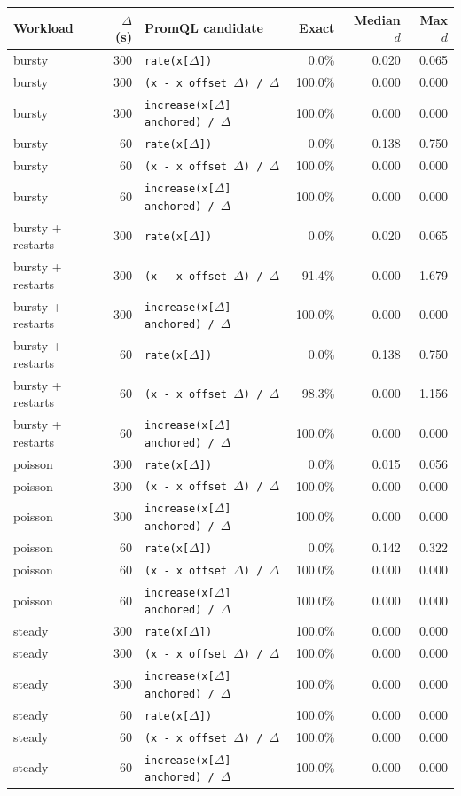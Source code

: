 \begin{tabular}{@{}lrlrrr@{}}
\toprule
Workload & $\Delta$ (s) & PromQL candidate & Exact & Median $d$ & Max $d$ \\
\midrule
bursty & 300 & \texttt{rate(x[$\Delta$])} & 0.0\% & 0.020 & 0.065 \\
bursty & 300 & \texttt{(x - x offset $\Delta$) / $\Delta$} & 100.0\% & 0.000 & 0.000 \\
bursty & 300 & \texttt{increase(x[$\Delta$] anchored) / $\Delta$} & 100.0\% & 0.000 & 0.000 \\
bursty & 60 & \texttt{rate(x[$\Delta$])} & 0.0\% & 0.138 & 0.750 \\
bursty & 60 & \texttt{(x - x offset $\Delta$) / $\Delta$} & 100.0\% & 0.000 & 0.000 \\
bursty & 60 & \texttt{increase(x[$\Delta$] anchored) / $\Delta$} & 100.0\% & 0.000 & 0.000 \\
bursty + restarts & 300 & \texttt{rate(x[$\Delta$])} & 0.0\% & 0.020 & 0.065 \\
bursty + restarts & 300 & \texttt{(x - x offset $\Delta$) / $\Delta$} & 91.4\% & 0.000 & 1.679 \\
bursty + restarts & 300 & \texttt{increase(x[$\Delta$] anchored) / $\Delta$} & 100.0\% & 0.000 & 0.000 \\
bursty + restarts & 60 & \texttt{rate(x[$\Delta$])} & 0.0\% & 0.138 & 0.750 \\
bursty + restarts & 60 & \texttt{(x - x offset $\Delta$) / $\Delta$} & 98.3\% & 0.000 & 1.156 \\
bursty + restarts & 60 & \texttt{increase(x[$\Delta$] anchored) / $\Delta$} & 100.0\% & 0.000 & 0.000 \\
poisson & 300 & \texttt{rate(x[$\Delta$])} & 0.0\% & 0.015 & 0.056 \\
poisson & 300 & \texttt{(x - x offset $\Delta$) / $\Delta$} & 100.0\% & 0.000 & 0.000 \\
poisson & 300 & \texttt{increase(x[$\Delta$] anchored) / $\Delta$} & 100.0\% & 0.000 & 0.000 \\
poisson & 60 & \texttt{rate(x[$\Delta$])} & 0.0\% & 0.142 & 0.322 \\
poisson & 60 & \texttt{(x - x offset $\Delta$) / $\Delta$} & 100.0\% & 0.000 & 0.000 \\
poisson & 60 & \texttt{increase(x[$\Delta$] anchored) / $\Delta$} & 100.0\% & 0.000 & 0.000 \\
steady & 300 & \texttt{rate(x[$\Delta$])} & 100.0\% & 0.000 & 0.000 \\
steady & 300 & \texttt{(x - x offset $\Delta$) / $\Delta$} & 100.0\% & 0.000 & 0.000 \\
steady & 300 & \texttt{increase(x[$\Delta$] anchored) / $\Delta$} & 100.0\% & 0.000 & 0.000 \\
steady & 60 & \texttt{rate(x[$\Delta$])} & 100.0\% & 0.000 & 0.000 \\
steady & 60 & \texttt{(x - x offset $\Delta$) / $\Delta$} & 100.0\% & 0.000 & 0.000 \\
steady & 60 & \texttt{increase(x[$\Delta$] anchored) / $\Delta$} & 100.0\% & 0.000 & 0.000 \\
\bottomrule
\end{tabular}
